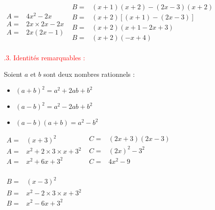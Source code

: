 \documentclass[10pt,a4paper]{article}
\newcounter{mysection}
\newcounter{mysubsection}
\newcommand{\mysubsection}[2]{
    \stepcounter{mysubsection}
    \textcolor{red}{\large \themysection.#1. #2 :}
}
\begin{document}
\begin{Exemple}
     \begin{multicols}{2}
       $\begin{array}{ll}
        A = & 4x^2 - 2x \\
        A = & 2x\times 2x - 2x\\
        A = & 2x(2x-1)
    \end{array}$
    \vfill
    \columnbreak
     $\begin{array}{ll}
        B = & (x + 1)(x + 2) - (2x - 3)(x + 2) \\
        B = & (x + 2)[(x + 1) - (2x - 3)] \\
        B = & (x + 2)(x + 1 - 2x + 3) \\
        B = & (x + 2)(-x + 4) \\
    \end{array}$
  \end{multicols}
\end{Exemple}

\mysubsection{3}{Identités remarquables}
\begin{Proposition}
    Soient $a$ et $b$ sont deux nombres rationnels : 
    \begin{itemize}
        \item $(a+b)^2 = a^2+2ab+b^2$
        \item $(a-b)^2 = a^2-2ab+b^2$
        \item $(a-b)(a+b) = a^2-b^2$
    \end{itemize}
\end{Proposition}

\begin{Exemple}
     \begin{multicols}{2}
       $\begin{array}{ll}
        A = & (x+3)^2  \\
        A = & x^2 + 2\times3\times x + 3^2\\
        A = & x^2 + 6x + 3^2\\
    \end{array}$
    \vfill 
    $\begin{array}{ll}
        C = & (2x+3)(2x-3)  \\
        C = & (2x)^2 - 3^2\\
        C = & 4x^2 - 9\\
    \end{array}$
    
    $\begin{array}{ll}
        B = & (x-3)^2  \\
        B = & x^2 - 2\times3\times x + 3^2\\
        B = & x^2 - 6x + 3^2\\
    \end{array}$
  \end{multicols}
\end{Exemple}
\end{document}
